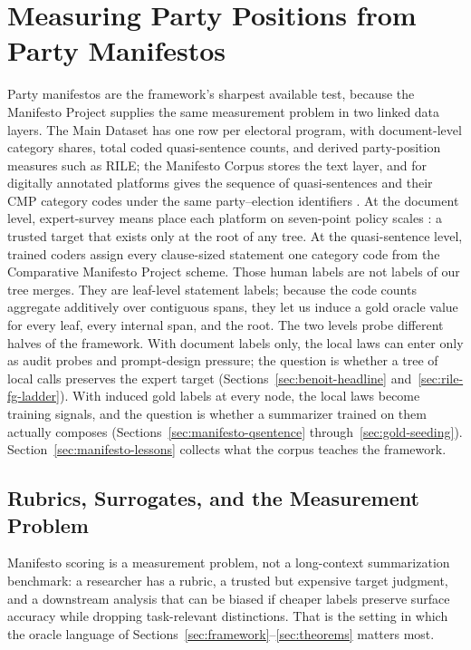 \section{Measuring Party Positions from Party Manifestos}\label{sec:manifesto-deepdive}\label{sec:manifesto-llm}

Party manifestos are the framework's sharpest available test, because
the Manifesto Project supplies the same measurement problem in two
linked data layers. The Main Dataset has one row per electoral program,
with document-level category shares, total coded quasi-sentence counts,
and derived party-position measures such as RILE; the Manifesto Corpus
stores the text layer, and for digitally annotated platforms gives the
sequence of quasi-sentences and their CMP category codes under the same
party--election identifiers
\citep{ManifestoProject2025a,ManifestoCorpus2025}. At the document
level, expert-survey means place each platform on seven-point policy
scales \citep{BenoitEtAl2025}: a trusted target that exists only at the
root of any tree. At the quasi-sentence level, trained coders assign
every clause-sized statement one category code from the Comparative
Manifesto Project scheme. Those human labels are not labels of our tree
merges. They are leaf-level statement labels; because the code counts
aggregate additively over contiguous spans, they let us induce a gold
oracle value for every leaf, every internal span, and the root. The two
levels probe different halves of the framework. With document labels
only, the local laws can enter only as audit probes and prompt-design
pressure; the question is whether a tree of local calls preserves the
expert target (Sections~\ref{sec:benoit-headline}
and~\ref{sec:rile-fg-ladder}). With induced gold labels at every node,
the local laws become training signals, and the question is whether a
summarizer trained on them actually composes
(Sections~\ref{sec:manifesto-qsentence} through~\ref{sec:gold-seeding}).
Section~\ref{sec:manifesto-lessons} collects what the corpus teaches
the framework.

\subsection{Rubrics, Surrogates, and the Measurement Problem}\label{sec:social-measurement}

Manifesto scoring is a measurement problem, not a long-context
summarization benchmark: a researcher has a rubric, a trusted but
expensive target judgment, and a downstream analysis that can be biased
if cheaper labels preserve surface accuracy while dropping
task-relevant distinctions. That is the setting in which the oracle
language of Sections~\ref{sec:framework}--\ref{sec:theorems} matters
most.

